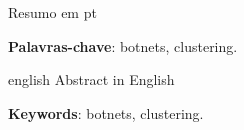 \begin{resumo}
	Resumo em pt

	\vspace{\onelineskip}
	\noindent
	\textbf{Palavras-chave}: botnets, clustering.
\end{resumo}

\begin{resumo}[Abstract]
	\begin{otherlanguage*}{english}
		Abstract in English

		\vspace{\onelineskip}
		\noindent
		\textbf{Keywords}: botnets, clustering.
	\end{otherlanguage*}
\end{resumo}